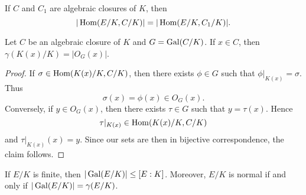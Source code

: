 \begin{exercise}
\label{xca:gamma_C}
    If $C$ and $C_1$ are algebraic closures of $K$, then
    \[
    |\operatorname{Hom}(E/K,C/K)|=|\operatorname{Hom}(E/K,C_1/K)|.
    \]
\end{exercise}

\begin{proposition}
\label{pro:gamma_orbit}
    Let $C$ be an algebraic closure of $K$ and $G=\operatorname{Gal}(C/K)$. 
    If $x\in C$, then $\gamma(K(x)/K)=|O_G(x)|$. 
\end{proposition}

\begin{proof}
    If $\sigma\in\operatorname{Hom}(K(x)/K,C/K)$, then there exists $\phi\in G$ such that
    $\phi|_{K(x)}=\sigma$. Thus 
    \[
    \sigma(x)=\phi(x)\in O_G(x).
    \]
    Conversely,
    if $y\in O_G(x)$, then there exists $\tau\in G$ such that
    $y=\tau(x)$. Hence 
    \[
    \tau|_{K(x)}\in\operatorname{Hom}(K(x)/K,C/K)
    \]
    and 
    $\tau|_{K(x)}(x)=y$. Since our sets are then in bijective correspondence, 
    the claim follows. 
\end{proof}


\begin{exercise}
If $E/K$ is finite, then $|\operatorname{Gal}(E/K)|\leq [E:K]$. Moreover, 
$E/K$ is normal if and only if $|\operatorname{Gal}(E/K)|=\gamma(E/K)$. 
\end{exercise}

